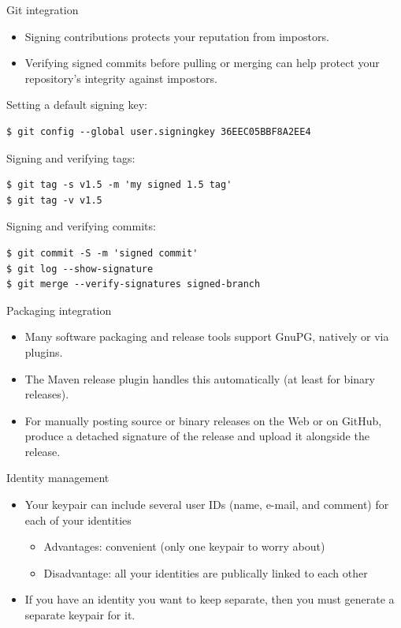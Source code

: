 \documentclass[
mode=present,
paper=smartboard,
size=20pt,
]{powerdot}
\newcommand\vsp{\vspace{-16mm}}
\begin{document}
\makeatletter\renewcommand{\verbatim@font}{\footnotesize\tt}\makeatother
\begin{slide}[method=direct]{Git integration}
  \begin{itemize}
  \item Signing contributions protects your reputation from impostors.
  \item Verifying signed commits before pulling or merging can help
    protect your repository's integrity against impostors.
  \end{itemize}

Setting a default signing key:

\vsp
\begin{verbatim}
$ git config --global user.signingkey 36EEC05BBF8A2EE4
\end{verbatim}

Signing and verifying tags:

\vsp
\begin{verbatim}
$ git tag -s v1.5 -m 'my signed 1.5 tag'
$ git tag -v v1.5
\end{verbatim}

Signing and verifying commits:

\vsp
\begin{verbatim}
$ git commit -S -m 'signed commit'
$ git log --show-signature
$ git merge --verify-signatures signed-branch
\end{verbatim}
\end{slide}

\begin{slide}{Packaging integration}
  \begin{itemize}
  \item Many software packaging and release tools support GnuPG,
    natively or via plugins.
  \item The Maven release plugin handles this automatically (at least
    for binary releases).
  \item For manually posting source or binary releases on the Web or
    on GitHub, produce a detached signature of the release and upload
    it alongside the release.
  \end{itemize}
\end{slide}

\begin{slide}{Identity management}
  \begin{itemize}
  \item Your keypair can include several user IDs (name, e-mail, and
    comment) for each of your identities
    \begin{itemize}
    \item Advantages: convenient (only one keypair to worry about)
    \item Disadvantage: all your identities are publically linked to
      each other
    \end{itemize}
  \item If you have an identity you want to keep separate, then you
    must generate a separate keypair for it.
  \end{itemize}
\end{slide}
\end{document}
